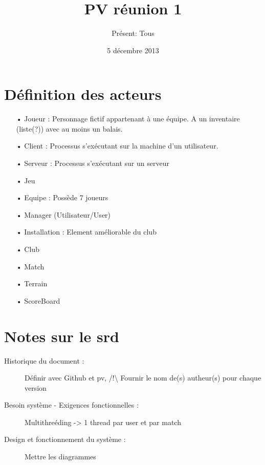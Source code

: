\documentclass[a4paper,10pt]{article}
\author{Présent: Tous}
\title{PV réunion 1}
\date{5 décembre 2013}
\begin{document}
\maketitle



\part*{Définition des acteurs}
\begin{enumerate}
\item[•] Joueur : Personnage fictif appartenant à une équipe. A un inventaire (liste(?)) avec au moins un balais.
\item[•] Client : Processus s'exécutant sur la machine d'un utilisateur.
\item[•] Serveur : Processus s'exécutant sur un serveur
\item[•] Jeu
\item[•] Equipe : Possède 7 joueurs
\item[•] Manager (Utilisateur/User)
\item[•] Installation : Element améliorable du club
\item[•] Club
\item[•] Match
\item[•] Terrain
\item[•] ScoreBoard
\end{enumerate}
\part*{Notes sur le srd}
\begin{description}
\item[Historique du document : ]Définir avec Github et pv, /!\textbackslash{} Fournir le nom de(s) autheur(s) pour chaque version
\item[Besoin système - Exigences fonctionnelles : ]Multithreéding -> 1 thread par user et par match
\item[Design et fonctionnement du système : ]Mettre les diagrammes
\end{description}
\end{document}
